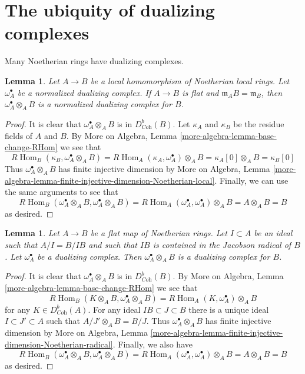 \documentclass{stacks-project}
\theoremstyle{plain}
\newtheorem{lemma}[subsection]{Lemma}
\theoremstyle{definition}
\theoremstyle{remark}
\numberwithin{equation}{subsection}
\def\Hom{\mathop{\mathrm{Hom}}\nolimits}
\begin{document}
\section{The ubiquity of dualizing complexes}
\label{section-ubiquity-dualizing}

\noindent
Many Noetherian rings have dualizing complexes.

\begin{lemma}
\label{lemma-flat-unramified}
Let $A \to B$ be a local homomorphism of Noetherian local rings.
Let $\omega_A^\bullet$ be a normalized dualizing complex.
If $A \to B$ is flat and $\mathfrak m_A B = \mathfrak m_B$,
then $\omega_A^\bullet \otimes_A B$ is a normalized dualizing
complex for $B$.
\end{lemma}

\begin{proof}
It is clear that $\omega_A^\bullet \otimes_A B$ is in $D^b_{\textit{Coh}}(B)$.
Let $\kappa_A$ and $\kappa_B$ be the residue fields of $A$ and $B$.
By More on Algebra, Lemma \ref{more-algebra-lemma-base-change-RHom}
we see that
$$
R\Hom_B(\kappa_B, \omega_A^\bullet \otimes_A B) =
R\Hom_A(\kappa_A, \omega_A^\bullet) \otimes_A B =
\kappa_A[0] \otimes_A B = \kappa_B[0]
$$
Thus $\omega_A^\bullet \otimes_A B$ has finite injective dimension by
More on Algebra, Lemma
\ref{more-algebra-lemma-finite-injective-dimension-Noetherian-local}.
Finally, we can use the same arguments to see that
$$
R\Hom_B(\omega_A^\bullet \otimes_A B, \omega_A^\bullet \otimes_A B) =
R\Hom_A(\omega_A^\bullet, \omega_A^\bullet) \otimes_A B = A \otimes_A B = B
$$
as desired.
\end{proof}

\begin{lemma}
\label{lemma-flat-iso-mod-I}
Let $A \to B$ be a flat map of Noetherian rings. Let
$I \subset A$ be an ideal such that $A/I = B/IB$ and
such that $IB$ is contained in the Jacobson radical of $B$.
Let $\omega_A^\bullet$ be a dualizing complex.
Then $\omega_A^\bullet \otimes_A B$ is a dualizing
complex for $B$.
\end{lemma}

\begin{proof}
It is clear that $\omega_A^\bullet \otimes_A B$ is in $D^b_{\textit{Coh}}(B)$.
By More on Algebra, Lemma \ref{more-algebra-lemma-base-change-RHom}
we see that
$$
R\Hom_B(K \otimes_A B, \omega_A^\bullet \otimes_A B) =
R\Hom_A(K, \omega_A^\bullet) \otimes_A B
$$
for any $K \in D^b_{\textit{Coh}}(A)$. For any ideal
$IB \subset J \subset B$ there is a unique ideal $I \subset J' \subset A$
such that $A/J' \otimes_A B = B/J$. Thus $\omega_A^\bullet \otimes_A B$
has finite injective dimension by
More on Algebra, Lemma
\ref{more-algebra-lemma-finite-injective-dimension-Noetherian-radical}.
Finally, we also have
$$
R\Hom_B(\omega_A^\bullet \otimes_A B, \omega_A^\bullet \otimes_A B) =
R\Hom_A(\omega_A^\bullet, \omega_A^\bullet) \otimes_A B = A \otimes_A B = B
$$
as desired.
\end{proof}
\end{document}
